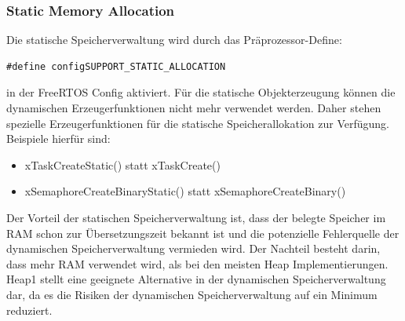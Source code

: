 \subsubsection{Static Memory Allocation}
Die statische Speicherverwaltung wird durch das Prä\-pro\-zes\-sor-Define:
\begin{lstlisting}[label=lst:staticMemory, numbers = none]
#define configSUPPORT_STATIC_ALLOCATION
\end{lstlisting}
in der FreeRTOS Config aktiviert. Für die statische Objekterzeugung können die dynamischen Erzeugerfunktionen nicht mehr verwendet werden. Daher stehen spezielle Erzeugerfunktionen für die statische Speicherallokation zur Verfügung. Beispiele hierfür sind: 
\begin{itemize}
	\item xTaskCreateStatic() statt xTaskCreate()
	\item xSemaphoreCreateBinaryStatic() statt xSemaphoreCreateBinary()
\end{itemize}
Der Vorteil der statischen Speicherverwaltung ist, dass der belegte Speicher im RAM schon zur Übersetzungszeit bekannt ist und die potenzielle Fehlerquelle der dynamischen Speicherverwaltung vermieden wird. Der Nachteil besteht darin, dass mehr RAM verwendet wird, als bei den meisten Heap Implementierungen. Heap1 stellt eine geeignete Alternative in der dynamischen Speicherverwaltung dar, da es die Risiken der dynamischen Speicherverwaltung auf ein Minimum reduziert.   